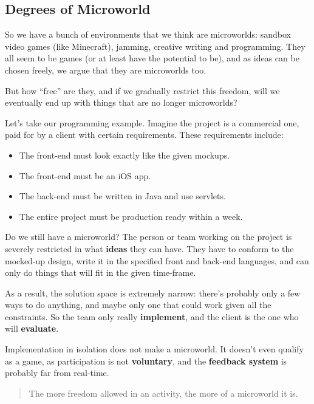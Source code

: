 \subsection{Degrees of Microworld}

So we have a bunch of environments that we think are microworlds:
sandbox video games (like Minecraft), jamming, creative writing and
programming. They all seem to be games (or at least have the potential
to be), and as ideas can be chosen freely, we argue that they are
microworlds too.

But how ``free'' are they, and if we gradually restrict this freedom,
will we eventually end up with things that are no longer microworlds?

Let's take our programming example. Imagine the project is a commercial
one, paid for by a client with certain requirements. These requirements
include: 

\begin{itemize}

\item The front-end must look exactly like the given mockups. 
\item The front-end must be an iOS app. 
\item The back-end must be written in Java and use servlets. 
\item The entire project must be production ready within a week.

\end{itemize}

Do we still have a microworld? The person or team working on the project
is severely restricted in what \textbf{ideas} they can have. They have
to conform to the mocked-up design, write it in the specified front and
back-end languages, and can only do things that will fit in the given
time-frame.

As a result, the solution space is extremely narrow: there's probably
only a few ways to do anything, and maybe only one that could work given
all the constraints. So the team only really \textbf{implement}, and the
client is the one who will \textbf{evaluate}.

Implementation in isolation does not make a microworld. It doesn't even qualify as
a game, as participation is not \textbf{voluntary}, and the
\textbf{feedback system} is probably far from real-time.

\begin{quote}
The more freedom allowed in an activity, the more of a microworld it is.
\end{quote}

